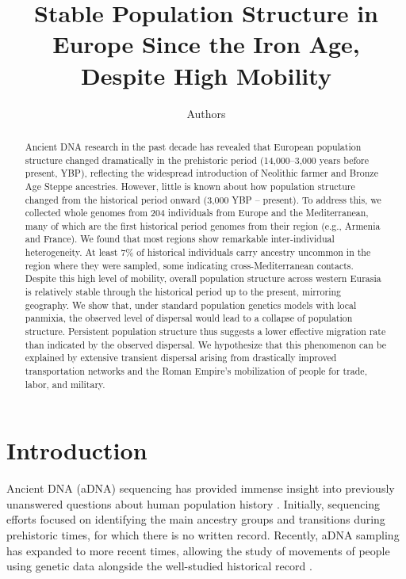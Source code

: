 \documentclass[11pt]{article}
\title{Stable Population Structure in Europe Since the Iron Age, Despite High Mobility}
\author{Authors}
\date{}
\begin{document}
\maketitle

\begin{abstract}
Ancient DNA research in the past decade has revealed that European population structure changed dramatically in the prehistoric period (14,000--3,000 years before present, YBP), reflecting the widespread introduction of Neolithic farmer and Bronze Age Steppe ancestries. However, little is known about how population structure changed from the historical period onward (3,000 YBP -- present). To address this, we collected whole genomes from 204 individuals from Europe and the Mediterranean, many of which are the first historical period genomes from their region (e.g., Armenia and France). We found that most regions show remarkable inter-individual heterogeneity. At least 7\% of historical individuals carry ancestry uncommon in the region where they were sampled, some indicating cross-Mediterranean contacts. Despite this high level of mobility, overall population structure across western Eurasia is relatively stable through the historical period up to the present, mirroring geography. We show that, under standard population genetics models with local panmixia, the observed level of dispersal would lead to a collapse of population structure. Persistent population structure thus suggests a lower effective migration rate than indicated by the observed dispersal. We hypothesize that this phenomenon can be explained by extensive transient dispersal arising from drastically improved transportation networks and the Roman Empire's mobilization of people for trade, labor, and military.
\end{abstract}

\section{Introduction}

Ancient DNA (aDNA) sequencing has provided immense insight into previously unanswered questions about human population history \citep{Allentoft2015,Haak2015,Lazaridis2014}. Initially, sequencing efforts focused on identifying the main ancestry groups and transitions during prehistoric times, for which there is no written record. Recently, aDNA sampling has expanded to more recent times, allowing the study of movements of people using genetic data alongside the well-studied historical record \citep{Antonio2019,Clemente2021}.
\end{document}
